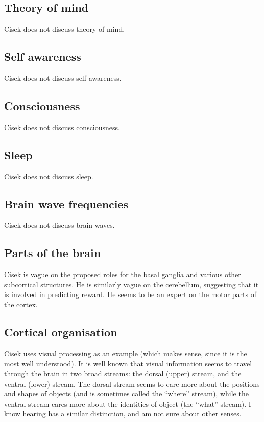 \documentclass[10pt,a4paper]{article}
\newcommand{\nquote}[1]{``{#1}''}
\begin{document}
\subsection{Theory of mind}
Cisek does not discuss theory of mind.

\subsection{Self awareness}
Cisek does not discuss self awareness.

\subsection{Consciousness}
Cisek does not discuss consciousness.

\subsection{Sleep}
Cisek does not discuss sleep.

\subsection{Brain wave frequencies}
Cisek does not discuss brain waves.

\subsection{Parts of the brain}
Cisek is vague on the proposed roles for the basal ganglia and various other subcortical structures. He is similarly vague on the cerebellum, suggesting that it is involved in predicting reward. He seems to be an expert on the motor parts of the cortex.

\subsection{Cortical organisation}
Cisek uses visual processing as an example (which makes sense, since it is the most well understood). It is well known that visual information seems to travel through the brain in two broad streams: the dorsal (upper) stream, and the ventral (lower) stream. The dorsal stream seems to care more about the positions and shapes of objects (and is sometimes called the \nquote{where} stream), while the ventral stream cares more about the identities of object (the \nquote{what} stream). I know hearing has a similar distinction, and am not sure about other senses.
\end{document}
